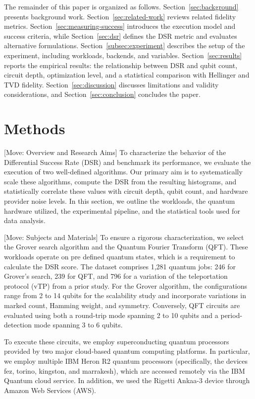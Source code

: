 \documentclass{article}
\begin{document}
The remainder of this paper is organized as follows. Section~\ref{sec:background} presents background work. Section~\ref{sec:related-work} reviews related fidelity metrics. Section~\ref{sec:measuring-success} introduces the execution model and success criteria, while Section~\ref{sec:dsr} defines the DSR metric and evaluates alternative formulations. Section~\ref{subsec:experiment} describes the setup of the experiment, including workloads, backends, and variables. Section~\ref{sec:results} reports the empirical results: the relationship between DSR and qubit count, circuit depth, optimization level, and a statistical comparison with Hellinger and TVD fidelity. Section~\ref{sec:discussion} discusses limitations and validity considerations, and Section~\ref{sec:conclusion} concludes the paper.

\section{Methods}

[Move: Overview and Research Aims] To characterize the behavior of the Differential Success Rate (DSR) and benchmark its performance, we evaluate the execution of two well-defined algorithms. Our primary aim is to systematically scale these algorithms, compute the DSR from the resulting histograms, and statistically correlate these values with circuit depth, qubit count, and hardware provider noise levels. In this section, we outline the workloads, the quantum hardware utilized, the experimental pipeline, and the statistical tools used for data analysis.

[Move: Subjects and Materials] To ensure a rigorous characterization, we select the Grover search algorithm and the Quantum Fourier Transform (QFT). These workloads operate on pre defined quantum states, which is a requirement to calculate the DSR score. The dataset comprises 1,281 quantum jobs: 246 for Grover's search, 239 for QFT, and 796 for a variation of the teleportation protocol (vTP) from a prior study. For the Grover algorithm, the configurations range from 2 to 14 qubits for the scalability study and incorporate variations in marked count, Hamming weight, and symmetry. Conversely, QFT circuits are evaluated using both a round-trip mode spanning 2 to 10 qubits and a period-detection mode spanning 3 to 6 qubits.

To execute these circuits, we employ superconducting quantum processors provided by two major cloud-based quantum computing platforms. In particular, we employ multiple IBM Heron R2 quantum processors (specifically, the devices fez, torino, kingston, and marrakesh), which are accessed remotely via the IBM Quantum cloud service. In addition, we used the Rigetti Ankaa-3 device through Amazon Web Services (AWS).
\end{document}
